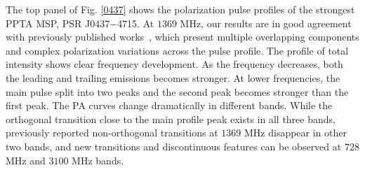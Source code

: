 \documentclass[useAMS,usenatbib]{mn2e}
\begin{document}
The top panel of Fig. \ref{0437} shows the polarization pulse profiles of the 
strongest PPTA MSP, PSR J0437$-$4715.
%
At $1369$ MHz, our results are in good agreement with previously published 
works~\citep{Johnston93,Manchester95_1,Navarro97,Yan11}, which present 
multiple overlapping components and complex polarization variations across 
the pulse profile. 
%
%
The profile of total intensity shows clear frequency development. As the 
frequency decreases, both the leading and trailing emissions becomes stronger.
%
At lower frequencies, the main pulse split into two peaks and the second peak
becomes stronger than the first peak.
%
The PA curves change dramatically in different bands. While the orthogonal 
transition close to the main profile peak exists in all three bands, previously
reported non-orthogonal transitions at $1369$ MHz disappear in other two bands,
and new transitions and discontinuous features can be observed at $728$ MHz 
and $3100$ MHz bands.
%

\end{document}
